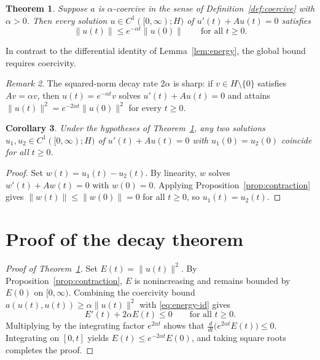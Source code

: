 \documentclass{article}
\newtheorem{theorem}{Theorem}[section]
\newtheorem{corollary}[theorem]{Corollary}
\theoremstyle{definition}
\theoremstyle{remark}
\newtheorem{remark}[theorem]{Remark}
\begin{document}
\begin{theorem}
\label{thm:decay}
Suppose $a$ is $\alpha$-coercive in the sense of Definition~\ref{def:coercive}
with $\alpha > 0$. Then every solution $u \in C^1([0,\infty); H)$ of
$u'(t) + A u(t) = 0$ satisfies
\[
\|u(t)\| \le e^{-\alpha t} \|u(0)\| \qquad \text{for all } t \ge 0.
\]
\end{theorem}

In contrast to the differential identity of Lemma~\ref{lem:energy}, the global bound requires coercivity.

\begin{remark}
\label{rem:sharpness}
The squared-norm decay rate $2\alpha$ is sharp: if $v \in H \setminus \{0\}$
satisfies $A v = \alpha v$, then $u(t) = e^{-\alpha t} v$ solves
$u'(t) + A u(t) = 0$ and attains $\|u(t)\|^2 = e^{-2\alpha t}\|u(0)\|^2$ for
every $t \ge 0$.
\end{remark}

\begin{corollary}
\label{cor:uniqueness}
Under the hypotheses of Theorem~\ref{thm:decay}, any two solutions
$u_1, u_2 \in C^1([0,\infty); H)$ of $u'(t) + A u(t) = 0$ with
$u_1(0) = u_2(0)$ coincide for all $t \ge 0$.
\end{corollary}
\begin{proof}
Set $w(t) = u_1(t) - u_2(t)$. By linearity, $w$ solves $w'(t) + A w(t) = 0$
with $w(0) = 0$. Applying Proposition~\ref{prop:contraction} gives
$\|w(t)\| \le \|w(0)\| = 0$ for all $t \ge 0$, so $u_1(t) = u_2(t)$.
\end{proof}

\section{Proof of the decay theorem}
\label{sec:deferred-proofs}

\begin{proof}[Proof of Theorem~\ref{thm:decay}]
Set $E(t) = \|u(t)\|^2$. By Proposition~\ref{prop:contraction}, $E$ is
nonincreasing and remains bounded by $E(0)$ on $[0,\infty)$. Combining the
coercivity bound $a(u(t), u(t)) \ge \alpha \|u(t)\|^2$ with
\eqref{eq:energy-id} gives
\[
E'(t) + 2\alpha E(t) \le 0 \qquad \text{for all } t \ge 0.
\]
Multiplying by the integrating factor $e^{2\alpha t}$ shows that
$\frac{d}{dt}\bigl(e^{2\alpha t} E(t)\bigr) \le 0$. Integrating on $[0,t]$
yields $E(t) \le e^{-2\alpha t} E(0)$, and taking square roots completes the
proof.
\end{proof}
\end{document}
